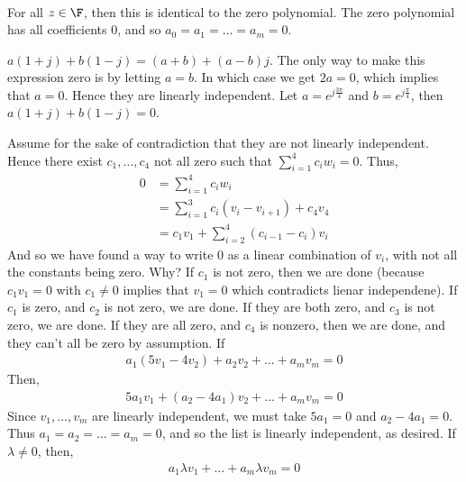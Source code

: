 \documentclass{book}
\begin{document}
\begin{enumerate}[label=\arabic*)]
\begin{enumerate}[label=\arabic*)]
\begin{align*}
            \end{align*}
            For all $z \in \F$, then this is identical to the zero polynomial. The zero polynomial has all coefficients $0$, and so $a_0 = a_1 = \dots = a_m = 0$.
        \end{enumerate}
      \addtocounter{enumi}{2}
      \ii 
      \begin{enumerate}[label=\roman*)]
        \ii $a(1 + j) + b(1 - j) = (a + b) + (a - b)j$. The only way to make this expression zero is by letting $a = b$. In which case we get $2a = 0$, which implies that $a =
        0$. Hence they are linearly independent.
        \ii Let $a = e^{j\frac{3\pi}{4}}$ and $b = e^{j\frac{\pi}{4}}$, then $a(1 + j) + b(1 - j) = 0$.
      \end{enumerate}
      \ii
        Assume for the sake of contradiction that they are not linearly independent. Hence there exist $c_1, \dots, c_4$ not all zero such that $\sum_{i = 1}^{4}c_iw_i = 0$.
        Thus,
        \begin{align*}
          0 & = \sum_{i = 1}^{4}c_iw_i \\
          & = \sum_{i = 1}^{3}c_i(v_i - v_{i + 1}) + c_4v_4 \\
          & = c_1v_1 + \sum_{i = 2}^{4}(c_{i - 1} - c_i)v_i
        \end{align*}
        And so we have found a way to write $0$ as a linear combination of $v_i$, with not all the constants being zero. Why? If $c_1$ is not zero, then we are done (because
        $c_1v_1 = 0$ with $c_1 \neq 0$ implies that $v_1 = 0$ which contradicts lienar independene). If $c_1$ is zero, and $c_2$ is not zero, we are done. If they are both
        zero, and $c_3$ is not zero, we are done. If they are all zero, and $c_4$ is nonzero, then we are done, and they can't all be zero by assumption.
      \ii
        If 
        \begin{align*}
          a_1(5v_1 - 4v_2) + a_2v_2 + \dots + a_mv_m = 0
        \end{align*}
        Then,
        \begin{align*}
          5a_1v_1 + (a_2 - 4a_1)v_2 + \dots + a_mv_m = 0
        \end{align*}
        Since $v_1, \dots, v_m$ are linearly independent, we must take $5a_1 = 0$ and $a_2 - 4a_1 = 0$. Thus $a_1 = a_2 = \dots = a_m = 0$, and so the list is linearly
        independent, as desired.
      \ii
        If $\lambda \neq 0$, then,
        \begin{align*}
          a_1\lambda v_1 + \dots + a_m\lambda v_m = 0

\end{align*}
\end{enumerate}
\end{document}
